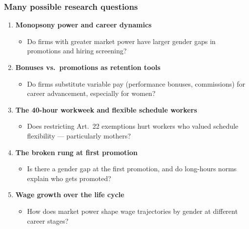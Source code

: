 \documentclass[aspectratio=169, 11pt]{beamer}
\begin{document}
\begin{frame}
\frametitle{Many possible research questions}

\small
\begin{enumerate}\itemsep4pt
    \item \textbf{Monopsony power and career dynamics}
    \begin{itemize}
        \item Do firms with greater market power have larger gender gaps in promotions and hiring screening?
    \end{itemize}

    \item \textbf{Bonuses vs.\ promotions as retention tools}
    \begin{itemize}
        \item Do firms substitute variable pay (performance bonuses, commissions) for career advancement, especially for women?
    \end{itemize}

    \item \textbf{The 40-hour workweek and flexible schedule workers}
    \begin{itemize}
        \item Does restricting Art.\ 22 exemptions hurt workers who valued schedule flexibility --- particularly mothers?
    \end{itemize}

    \item \textbf{The broken rung at first promotion}
    \begin{itemize}
        \item Is there a gender gap at the first promotion, and do long-hours norms explain who gets promoted?
    \end{itemize}

    \item \textbf{Wage growth over the life cycle}
    \begin{itemize}
        \item How does market power shape wage trajectories by gender at different career stages?
    \end{itemize}
\end{enumerate}

\end{frame}
\end{document}
